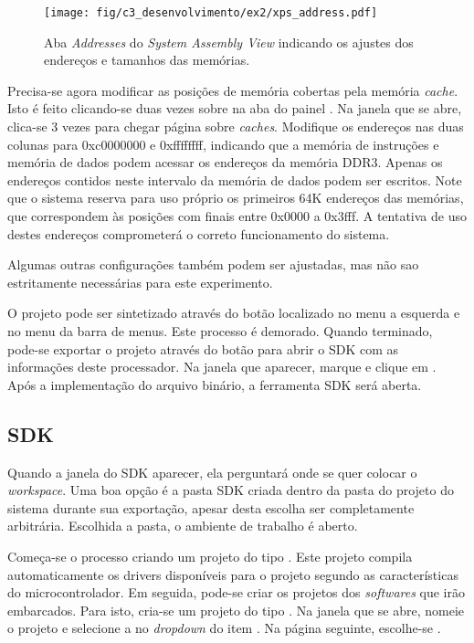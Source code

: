 \documentclass[11pt,a4paper,oneside]{book}
\begin{document}
\begin{figure}[htp]
\centering
\texttt{[image: fig/c3\_desenvolvimento/ex2/xps\_address.pdf]}
\caption{Aba \textit{Addresses} do \textit{System Assembly View} indicando os ajustes dos endereços e tamanhos das memórias.}
\label{fig:ex2:xps_enderecos}
\end{figure}

Precisa-se agora modificar as posições de memória cobertas pela memória \textit{cache}.
Isto é feito clicando-se duas vezes sobre  na aba  do painel .
Na janela que se abre, clica-se   3 vezes para chegar página sobre \textit{caches}.
Modifique os endereços nas duas colunas para 0xc0000000 e 0xffffffff, indicando que a memória de instruções e memória de dados podem acessar os endereços da memória DDR3.
Apenas os endereços contidos neste intervalo da memória de dados podem ser escritos.
Note que o sistema reserva para uso próprio os primeiros 64K endereços das memórias, que correspondem às posições com finais entre 0x0000 a 0x3fff.
A tentativa de uso destes endereços comprometerá o correto funcionamento do sistema.

Algumas outras configurações também podem ser ajustadas, mas não sao estritamente necessárias para este experimento.

O projeto pode ser sintetizado através do botão  localizado no menu a esquerda e no menu  da barra de menus.
Este processo é demorado.
Quando terminado, pode-se exportar o projeto através do botão  para abrir o SDK com as informações deste processador.
Na janela que aparecer, marque  e clique em .
Após a implementação do arquivo binário, a ferramenta SDK será aberta.

\subsection{SDK}
Quando a janela do SDK aparecer, ela perguntará onde se quer colocar o \textit{workspace}.
Uma boa opção é a pasta SDK criada dentro da pasta do projeto do sistema durante sua exportação, apesar desta escolha ser completamente arbitrária.
Escolhida a pasta, o ambiente de trabalho é aberto.

Começa-se o processo criando um projeto do tipo .
Este projeto compila automaticamente os drivers disponíveis para o projeto segundo as características do microcontrolador.
Em seguida, pode-se criar os projetos dos \textit{softwares} que irão embarcados.
Para isto, cria-se um projeto do tipo .
Na janela que se abre, nomeie o projeto e selecione a  no \textit{dropdown} do item .
Na página seguinte, escolhe-se .
\end{document}
